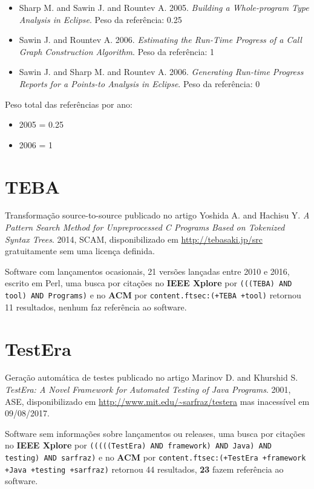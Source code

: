 \begin{itemize}
\item Sharp M. and Sawin J. and Rountev A.
      2005.
      {\it Building a Whole-program Type Analysis in Eclipse}.
      Peso da referência: 0.25
\item Sawin J. and Rountev A.
      2006.
      {\it Estimating the Run-Time Progress of a Call Graph Construction Algorithm}.
      Peso da referência: 1
\item Sawin J. and Sharp M. and Rountev A.
      2006.
      {\it Generating Run-time Progress Reports for a Points-to Analysis in Eclipse}.
      Peso da referência: 0
\end{itemize}

Peso total das referências por ano:

\begin{itemize}
\item 2005 = 0.25
\item 2006 = 1
\end{itemize}


\section{TEBA}

Transformação source-to-source
publicado no artigo
Yoshida A. and Hachisu Y.
{\it A Pattern Search Method for Unpreprocessed C Programs Based on Tokenized Syntax Trees}.
2014,
SCAM,
disponibilizado em \url{http://tebasaki.jp/src}
gratuitamente
sem uma licença definida.

Software com lançamentos ocasionais,
21 versões lançadas
entre 2010 e 2016,
escrito em Perl,
uma busca por citações no {\bf IEEE Xplore} por
\texttt{(((TEBA) AND tool) AND Programs)}
e no {\bf ACM} por
\texttt{content.ftsec:(+TEBA +tool)}
retornou
11 resultados,
nenhum faz referência ao software.


\section{TestEra}

Geração automática de testes
publicado no artigo
Marinov D. and Khurshid S.
{\it TestEra: A Novel Framework for Automated Testing of Java Programs}.
2001,
ASE,
disponibilizado em \url{http://www.mit.edu/~sarfraz/testera}
mas inacessível em 09/08/2017.

Software sem informações sobre lançamentos ou releases,
uma busca por citações no {\bf IEEE Xplore} por
\texttt{(((((TestEra) AND framework) AND Java) AND testing) AND sarfraz)}
e no {\bf ACM} por
\texttt{content.ftsec:(+TestEra +framework +Java +testing +sarfraz)}
retornou
44 resultados,
{\bf 23} fazem referência ao software.

